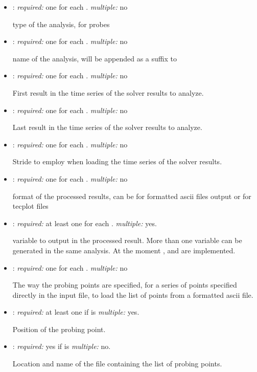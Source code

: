 \begin{itemize}
\item {}: \textit{required:} one for each . 
\textit{multiple:} no

type of the analysis,  for probes

\item {}: \textit{required:} one for each . 
\textit{multiple:} no

name of the analysis, will be appended as a suffix to 

\item {}: \textit{required:} one for each . 
\textit{multiple:} no

First result in the time series of the solver results to analyze.

\item {}: \textit{required:} one for each . 
\textit{multiple:} no

Last result in the time series of the solver results to analyze.

\item {}: \textit{required:} one for each . 
\textit{multiple:} no

Stride to employ when loading the time series of the solver results. 

\item {}: \textit{required:} one for each . 
\textit{multiple:} no

format of the processed results, can be  for formatted ascii files 
output or  for tecplot  files

\item {}: \textit{required:} at least one for each . 
\textit{multiple:} yes.

variable to output in the processed result. More than one variable can be generated in the same analysis. 
At the moment ,  and  are implemented.

\item {}: \textit{required:} one for each . \textit{multiple:} no

The way the probing points are specified,  for a series of 
points specified directly in the input file,  to load the list 
of points from a formatted ascii file.

\item {}: \textit{required:} at least one if  is  
\textit{multiple:} yes.

Position of the probing point.

\item {}: \textit{required:} yes if  is  \textit{multiple:} no.

Location and name of the file containing the list of probing points.

\end{itemize}

